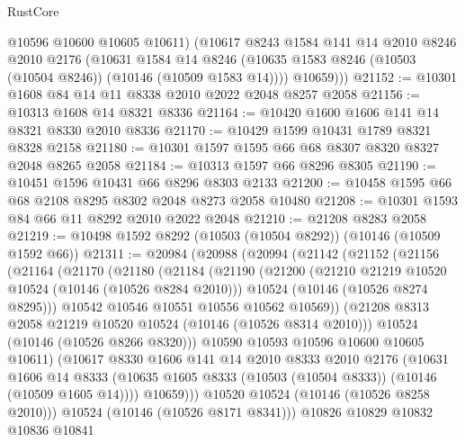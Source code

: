 \begin{lexlean}{RustCore}
\begin{coremodule}
          @10596
          @10600
          @10605
          @10611)
        (@10617
          @8243
          @1584
          @141
          @14
          @2010
          @8246
          @2010
          @2176
          (@10631
            @1584
            @14
            @8246
            (@10635 @1583 @8246 (@10503 (@10504 @8246)) (@10146 (@10509 @1583 @14))))
          @10659)))
@21152 := @10301 @1608 @84 @14 @11 @8338 @2010 @2022 @2048 @8257 @2058
@21156 := @10313 @1608 @14 @8321 @8336
@21164 := @10420 @1600 @1606 @141 @14 @8321 @8330 @2010 @8336
@21170 := @10429 @1599 @10431 @1789 @8321 @8328 @2158
@21180 := @10301 @1597 @1595 @66 @68 @8307 @8320 @8327 @2048 @8265 @2058
@21184 := @10313 @1597 @66 @8296 @8305
@21190 := @10451 @1596 @10431 @66 @8296 @8303 @2133
@21200 := @10458 @1595 @66 @68 @2108 @8295 @8302 @2048 @8273 @2058 @10480
@21208 := @10301 @1593 @84 @66 @11 @8292 @2010 @2022 @2048
@21210 := @21208 @8283 @2058
@21219 := @10498 @1592 @8292 (@10503 (@10504 @8292)) (@10146 (@10509 @1592 @66))
@21311 := @20984
    (@20988
      (@20994
        (@21142
          (@21152
            (@21156
              (@21164
                (@21170
                  (@21180
                    (@21184
                      (@21190
                        (@21200
                          (@21210 @21219 @10520 @10524 (@10146 (@10526 @8284 @2010)))
                          @10524
                          (@10146 (@10526 @8274 @8295)))
                        @10542
                        @10546
                        @10551
                        @10556
                        @10562
                        @10569))
                    (@21208 @8313 @2058 @21219 @10520 @10524 (@10146 (@10526 @8314 @2010)))
                    @10524
                    (@10146 (@10526 @8266 @8320)))
                  @10590
                  @10593
                  @10596
                  @10600
                  @10605
                  @10611)
                (@10617
                  @8330
                  @1606
                  @141
                  @14
                  @2010
                  @8333
                  @2010
                  @2176
                  (@10631
                    @1606
                    @14
                    @8333
                    (@10635 @1605 @8333 (@10503 (@10504 @8333)) (@10146 (@10509 @1605 @14))))
                  @10659)))
            @10520
            @10524
            (@10146 (@10526 @8258 @2010)))
          @10524
          (@10146 (@10526 @8171 @8341)))
        @10826
        @10829
        @10832
        @10836
        @10841

\end{coremodule}
\end{lexlean}
